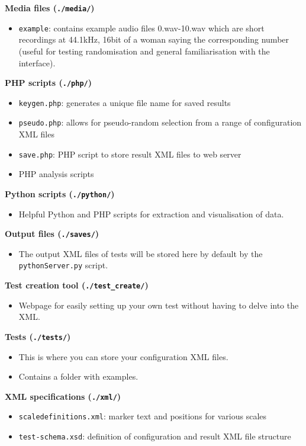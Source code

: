 \documentclass[11pt, oneside]{article}   	%
\begin{document}
         \textbf{Media files (\texttt{./media/})}
          	\begin{itemize}
              	\item \texttt{example}: contains example audio files 0.wav-10.wav which are short recordings at 44.1kHz, 16bit of a woman saying the corresponding number (useful for testing randomisation and general familiarisation with the interface).
          	\end{itemize}
        \textbf{PHP scripts (\texttt{./php/})}
        	\begin{itemize}
        		\item \texttt{keygen.php}: generates a unique file name for saved results
            	\item \texttt{pseudo.php}: allows for pseudo-random selection from a range of configuration XML files
				\item \texttt{save.php}: PHP script to store result XML files to web server
        		\item PHP analysis scripts %
        	\end{itemize}
         \textbf{Python scripts (\texttt{./python/})}
        	\begin{itemize}
        		\item Helpful Python and PHP scripts for extraction and visualisation of data.\\ 
        	\end{itemize}
        \textbf{Output files (\texttt{./saves/})}
        	\begin{itemize}
        		\item The output XML files of tests will be stored here by default by the \texttt{pythonServer.py} script.\\ 
        	\end{itemize}
        \textbf{Test creation tool (\texttt{./test\_create/})}
        	\begin{itemize}
        		\item Webpage for easily setting up your own test without having to delve into the XML.\\ 
        	\end{itemize}
        \textbf{Tests (\texttt{./tests/})}
        	\begin{itemize}
        		\item This is where you can store your configuration XML files.
        		\item Contains a folder with examples.\\  %
        	\end{itemize}
        \textbf{XML specifications (\texttt{./xml/})}
        	\begin{itemize}
        		\item \texttt{scaledefinitions.xml}: marker text and positions for various scales
            	\item \texttt{test-schema.xsd}: definition of configuration and result XML file structure\\  %
        	\end{itemize}
\end{document}
